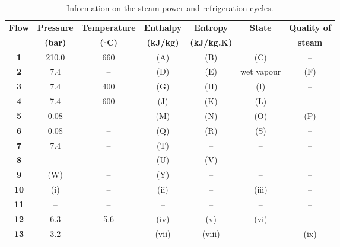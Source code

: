 \documentclass[12pts,a4paper,amsmath,amssymb,floatfix]{article}%
\begin{document}
\begin{table}[h]
\begin{center}
\begin{tabular}{ || c || c | c | c | c | c || c ||}
\hline\hline
{\bf Flow}& {\bf Pressure}  &  {\bf Temperature}   &  {\bf Enthalpy}  & {\bf Entropy}     & {\bf State}  & {\bf Quality of} \\
          & {\bf (bar)}     & {\bf ($^{\text{o}}$C)} &  {\bf (kJ/kg)}   &  {\bf (kJ/kg.K)}  &              & {\bf steam}      \\
\hline\hline
{\bf 1}   &   210.0         &      660         &      (A)          &      (B)             & (C)          &  --              \\
{\bf 2}   &   7.4           &       --         &      (D)          &      (E)             & wet vapour   &  (F)             \\
{\bf 3}   &   7.4           &      400         &      (G)          &      (H)             & (I)          &  --              \\
{\bf 4}   &   7.4           &      600         &      (J)          &      (K)             & (L)          &  --              \\ 
{\bf 5}   &   0.08          &      --          &      (M)          &      (N)             & (O)          &  (P)             \\ 
{\bf 6}   &   0.08          &      --          &      (Q)          &      (R)             & (S)          &  --              \\
{\bf 7}   &   7.4           &      --          &      (T)          &      --              & --           &   --             \\              
{\bf 8}   &   --            &      --          &      (U)          &      (V)             & --           & --               \\             
{\bf 9}   &   (W)           &      --          &      (Y)          &      --              & --           & --               \\
\hline \hline
{\bf 10}  &   (i)           &      --          &      (ii)         &      --             &  (iii)        &  --              \\
{\bf 11}  &  --             &      --          &      --           &      --             &   --          &   --             \\ 
{\bf 12}  &  6.3            &     5.6          &      (iv)         &      (v)            &  (vi)         &   --             \\
{\bf 13}  &  3.2            &     --           &     (vii)         &      (viii)         &   --         &    (ix)            \\ 
\hline\hline
\end{tabular}
\end{center}
\caption{Information on the steam-power and refrigeration cycles.}\label{Ex:Tab}
\end{table}
\end{document}
